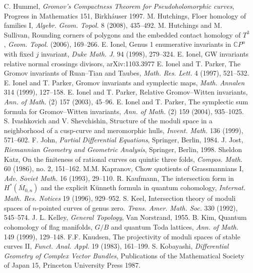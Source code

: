  C. Hummel, \emph{Gromov's Compactness Theorem for Pseudoholomorphic curves}, Progress in Mathematics 151, Birkh\'auser 1997.
 M. Hutchings, Floer homology of families I, \emph{Algebr. Geom. Topol.} 8 (2008), 435--492.
 M. Hutchings and M. Sullivan, Rounding corners of polygons and the embedded contact homology of $T^3$, \emph{Geom. Topol.} (2006), 169--266.
 E. Ionel, Genus 1 enumerative invariants in $\mathbb CP^n$ with fixed $j$ invariant, \emph{Duke Math. J.} 94 (1998), 279--324.
 E. Ionel, GW invariants relative normal crossings divisors, arXiv:1103.3977
 E. Ionel and T. Parker, The Gromov invariants of Ruan--Tian and Taubes, \emph{Math. Res. Lett.} 4 (1997), 521--532.
 E. Ionel and T. Parker, Gromov invariants and symplectic maps, \emph{Math. Annalen} 314 (1999), 127--158.
 E. Ionel and T. Parker, Relative Gromov--Witten invariants, \emph{Ann. of Math.} (2) 157 (2003), 45--96.
 E. Ionel and T. Parker, The symplectic sum formula for Gromov--Witten invariants, \emph{Ann. of Math.} (2) 159 (2004), 935--1025.
 S. Ivashkovich and V. Shevchishin, Structure of the moduli space in a neighborhood of a cusp-curve and meromorphic hulls, \emph{Invent. Math.} 136 (1999), 571--602.
 F. John, \emph{Partial Differential Equations}, Springer, Berlin, 1984.
 J. Jost, \emph{Riemannian Geometry and Geometric Analysis}, Springer, Berlin, 1998.
 Sheldon Katz, On the finiteness of rational curves on quintic three folds, \emph{Compos. Math.} 60 (1986), no. 2, 151--162.
 M.M. Kapranov, Chow quotients of Grassmannians I, \emph{Adv. Soviet Math.} 16 (1993), 29--110.
 R. Kaufmann, The intersection form in $H^*(\overline M_{0,n})$ and the explicit K\"unneth formula in quantum cohomology, \emph{Internat. Math. Res. Notices} 19 (1996), 929--952.
 S. Keel, Intersection theory of moduli spaces of $n$-pointed curves of genus zero. \emph{Trans. Amer. Math. Soc.} 330 (1992), 545--574.
 J. L. Kelley, \emph{General Topology}, Van Norstrand, 1955.
 B. Kim, Quantum cohomology of flag manifolds, $G/B$ and quantum Toda lattices, \emph{Ann. of Math.} 149 (1999), 129--148.
 F.F. Knudsen, The projectivity of moduli spaces of stable curves II, \emph{Funct. Anal. Appl.} 19 (1983), 161--199.
 S. Kobayashi, \emph{Differential Geometry of Complex Vector Bundles}, Publications of the Mathematical Society of Japan 15, Princeton University Press 1987.
